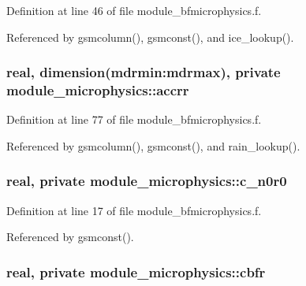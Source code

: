 Definition at line 46 of file module\+\_\+bfmicrophysics.\+f.



Referenced by gsmcolumn(), gsmconst(), and ice\+\_\+lookup().

\subsubsection[{\texorpdfstring{accrr}{accrr}}]{\setlength{\rightskip}{0pt plus 5cm}real, dimension(mdrmin\+:mdrmax), private module\+\_\+microphysics\+::accrr\hspace{0.3cm}{\ttfamily [private]}}\hypertarget{namespacemodule__microphysics_ac58ee32a06efc573a2c380d77cd4e5c5}{}\label{namespacemodule__microphysics_ac58ee32a06efc573a2c380d77cd4e5c5}


Definition at line 77 of file module\+\_\+bfmicrophysics.\+f.



Referenced by gsmcolumn(), gsmconst(), and rain\+\_\+lookup().

\subsubsection[{\texorpdfstring{c\+\_\+n0r0}{c_n0r0}}]{\setlength{\rightskip}{0pt plus 5cm}real, private module\+\_\+microphysics\+::c\+\_\+n0r0\hspace{0.3cm}{\ttfamily [private]}}\hypertarget{namespacemodule__microphysics_ac36c8de45d04aab21833d22133311284}{}\label{namespacemodule__microphysics_ac36c8de45d04aab21833d22133311284}


Definition at line 17 of file module\+\_\+bfmicrophysics.\+f.



Referenced by gsmconst().

\subsubsection[{\texorpdfstring{cbfr}{cbfr}}]{\setlength{\rightskip}{0pt plus 5cm}real, private module\+\_\+microphysics\+::cbfr\hspace{0.3cm}{\ttfamily [private]}}\hypertarget{namespacemodule__microphysics_afdcb4cd9370ca50745e65221becb6eae}{}\label{namespacemodule__microphysics_afdcb4cd9370ca50745e65221becb6eae}


